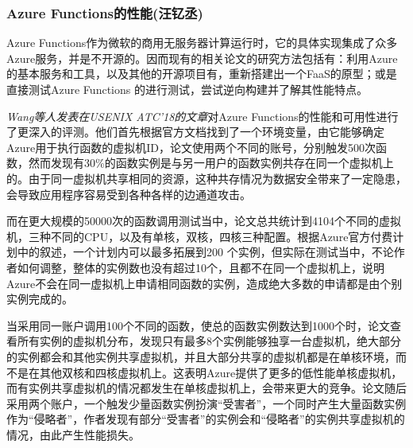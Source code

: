 \documentclass[11pt]{article}
\begin{document}
\subsubsection{Azure Functions的性能(汪钇丞)}
Azure Functions作为微软的商用无服务器计算运行时，它的具体实现集成了众多Azure服务，并是不开源的。因而现有的相关论文的研究方法包括有：利用Azure的基本服务和工具，以及其他的开源项目有，重新搭建出一个FaaS的原型\cite{mcgrath2017serverless}；或是直接测试Azure Functions 的进行测试，尝试逆向构建并了解其性能特点\cite{wang2018peeking}。

\cite{wang2018peeking}{\textit{Wang等人发表在USENIX ATC’18的文章}}对Azure Functions的性能和可用性进行了更深入的评测。他们首先根据官方文档找到了一个环境变量，由它能够确定Azure用于执行函数的虚拟机ID，论文使用两个不同的账号，分别触发500次函数，然而发现有30\%的函数实例是与另一用户的函数实例共存在同一个虚拟机上的。由于同一虚拟机共享相同的资源，这种共存情况为数据安全带来了一定隐患，会导致应用程序容易受到各种各样的边通道攻击。

而在更大规模的50000次的函数调用测试当中，论文总共统计到4104个不同的虚拟机，三种不同的CPU，以及有单核，双核，四核三种配置。根据Azure官方付费计划中的叙述，一个计划内可以最多拓展到200 个实例，但实际在测试当中，不论作者如何调整，整体的实例数也没有超过10个，且都不在同一个虚拟机上，说明Azure不会在同一虚拟机上申请相同函数的实例，造成绝大多数的申请都是由个别实例完成的。

当\cite{wang2018peeking}采用同一账户调用100个不同的函数，使总的函数实例数达到1000个时，论文查看所有实例的虚拟机分布，发现只有最多8个实例能够独享一台虚拟机，绝大部分的实例都会和其他实例共享虚拟机，并且大部分共享的虚拟机都是在单核环境，而不是在其他双核和四核虚拟机上。这表明Azure提供了更多的低性能单核虚拟机，而有实例共享虚拟机的情况都发生在单核虚拟机上，会带来更大的竞争。论文随后采用两个账户，一个触发少量函数实例扮演“受害者”，一个同时产生大量函数实例作为“侵略者”，作者发现有部分“受害者”的实例会和“侵略者”的实例共享虚拟机的情况，由此产生性能损失。
\end{document}
